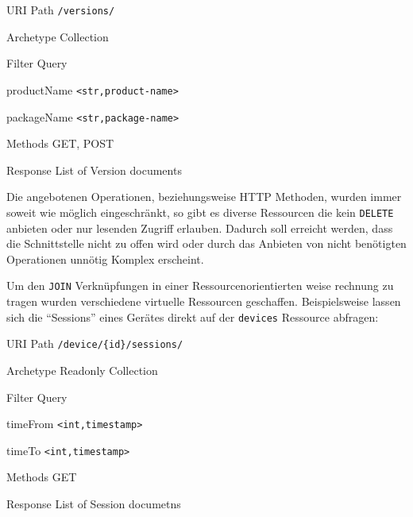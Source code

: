 \begin{mdframed}[style=def]
\begin{description*}
	\item[URI Path] \texttt{/versions/}
	\item[Archetype] Collection
	\item[Filter Query] \hfill
	\begin{description*}
		\item[productName] \texttt{<str,product-name>}
		\item[packageName] \texttt{<str,package-name>}
	\end{description*}
	\item[Methods] GET, POST
	\item[Response] List of Version documents
\end{description*}
\end{mdframed}

Die angebotenen Operationen, beziehungsweise HTTP Methoden, wurden immer soweit
wie möglich eingeschränkt, so gibt es diverse Ressourcen die kein
\texttt{DELETE} anbieten oder nur lesenden Zugriff erlauben. Dadurch soll
erreicht werden, dass die Schnittstelle nicht zu offen wird oder durch das
Anbieten von nicht benötigten Operationen unnötig Komplex erscheint.

Um den \texttt{JOIN} Verknüpfungen in einer Ressourcenorientierten weise
rechnung zu tragen wurden verschiedene virtuelle Ressourcen geschaffen.
Beispielsweise lassen sich die \enquote{Sessions} eines Gerätes direkt auf der
\texttt{devices} Ressource abfragen:

\begin{mdframed}[style=def]
\begin{description*}
	\item[URI Path] \texttt{/device/\{id\}/sessions/}
	\item[Archetype] Readonly Collection
	\item[Filter Query] \hfill
	\begin{description*}
		\item[timeFrom] \texttt{<int,timestamp>}
		\item[timeTo] \texttt{<int,timestamp>}
	\end{description*}	
	\item[Methods] GET
	\item[Response] List of Session documetns
\end{description*}
\end{mdframed}

